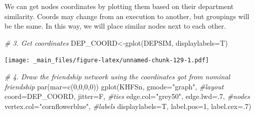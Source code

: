 \documentclass[
  notitlepage,
  onecolumn,
  openany]{book}
\newenvironment{Shaded}{\begin{snugshade}}{\end{snugshade}}
\newcommand{\AttributeTok}[1]{\textcolor[rgb]{0.77,0.63,0.00}{#1}}
\newcommand{\CommentTok}[1]{\textcolor[rgb]{0.56,0.35,0.01}{\textit{#1}}}
\newcommand{\ConstantTok}[1]{\textcolor[rgb]{0.00,0.00,0.00}{#1}}
\newcommand{\DecValTok}[1]{\textcolor[rgb]{0.00,0.00,0.81}{#1}}
\newcommand{\FunctionTok}[1]{\textcolor[rgb]{0.00,0.00,0.00}{#1}}
\newcommand{\NormalTok}[1]{#1}
\newcommand{\OtherTok}[1]{\textcolor[rgb]{0.56,0.35,0.01}{#1}}
\newcommand{\SpecialCharTok}[1]{\textcolor[rgb]{0.00,0.00,0.00}{#1}}
\newcommand{\StringTok}[1]{\textcolor[rgb]{0.31,0.60,0.02}{#1}}
\begin{document}
\begin{Shaded}
\end{Shaded}

We can get nodes coordinates by plotting them based on their department similarity. Coords may change from an execution to another, but groupings will be the same. In this way, we will place similar nodes next to each other.

\begin{Shaded}
\begin{Highlighting}[]
\CommentTok{\# 3. Get coordinates}
\NormalTok{DEP\_COORD}\OtherTok{\textless{}{-}}\FunctionTok{gplot}\NormalTok{(DEPSIM, }
                 \AttributeTok{displaylabels=}\NormalTok{T)}
\end{Highlighting}
\end{Shaded}

\texttt{[image: \_main\_files/figure-latex/unnamed-chunk-129-1.pdf]}

\begin{Shaded}
\begin{Highlighting}[]
\CommentTok{\# 4. Draw the friendship network using the coordinates got from nominal friendship}
\FunctionTok{par}\NormalTok{(}\AttributeTok{mar=}\FunctionTok{c}\NormalTok{(}\DecValTok{0}\NormalTok{,}\DecValTok{0}\NormalTok{,}\DecValTok{0}\NormalTok{,}\DecValTok{0}\NormalTok{))}
\FunctionTok{gplot}\NormalTok{(KHFSn,}
      \AttributeTok{gmode=}\StringTok{"graph"}\NormalTok{,}
      \CommentTok{\#layout}
      \AttributeTok{coord=}\NormalTok{DEP\_COORD,}
      \AttributeTok{jitter=}\NormalTok{F,}
      \CommentTok{\#ties}
      \AttributeTok{edge.col=}\StringTok{"grey50"}\NormalTok{,}
      \AttributeTok{edge.lwd=}\NormalTok{.}\DecValTok{7}\NormalTok{,}
      \CommentTok{\#nodes}
      \AttributeTok{vertex.col=}\StringTok{"cornflowerblue"}\NormalTok{,}
      \CommentTok{\#labels}
      \AttributeTok{displaylabels=}\NormalTok{T, }
      \AttributeTok{label.pos=}\DecValTok{1}\NormalTok{, }
      \AttributeTok{label.cex=}\NormalTok{.}\DecValTok{7}\NormalTok{)}
\end{Highlighting}
\end{Shaded}
\end{document}

